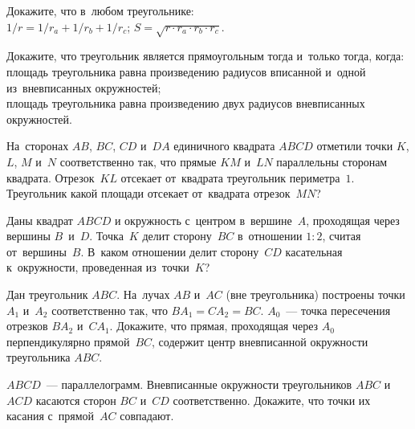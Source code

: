 


\begin{problems}

\item
Докажите, что в~любом треугольнике:\\
\subproblem
$1 / r = 1 / r_{a} + 1 / r_{b} + 1 / r_{c}$;
\qquad
\subproblem
$S = \sqrt{r \cdot r_{a} \cdot r_{b} \cdot r_{c}}$.

\item
Докажите, что треугольник является прямоугольным тогда и~только тогда, когда:
\\
\subproblem
площадь треугольника равна произведению радиусов вписанной и~одной
из~вневписанных окружностей;
\\
\subproblem
площадь треугольника равна произведению двух радиусов вневписанных окружностей.

\item
На~сторонах $AB$, $BC$, $CD$ и~$DA$ единичного квадрата $ABCD$ отметили точки
$K$, $L$, $M$ и~$N$ соответственно так, что прямые $KM$ и~$LN$ параллельны
сторонам квадрата.
Отрезок~$KL$ отсекает от~квадрата треугольник периметра~$1$.
Треугольник какой площади отсекает от~квадрата отрезок~$MN$?

\item
Даны квадрат $ABCD$ и окружность с~центром в~вершине~$A$, проходящая через
вершины $B$~и~$D$.
Точка~$K$ делит сторону~$BC$ в~отношении $1 : 2$, считая от~вершины~$B$.
В~каком отношении делит сторону~$CD$ касательная к~окружности, проведенная
из~точки~$K$?

\item
Дан треугольник $ABC$.
На~лучах $AB$ и~$AC$ (вне треугольника) построены точки $A_1$ и~$A_2$
соответственно так, что $B A_1 = C A_2 = BC$.
$A_0$~--- точка пересечения отрезков $B A_2$ и~$C A_1$.
Докажите, что прямая, проходящая через $A_0$ перпендикулярно прямой~$BC$,
содержит центр вневписанной окружности треугольника $ABC$.

\item
$ABCD$~--- параллелограмм.
Вневписанные окружности треугольников $ABC$ и~$ACD$ касаются сторон $BC$ и~$CD$
соответственно.
Докажите, что точки их касания с~прямой~$AC$ совпадают.


\end{problems}
